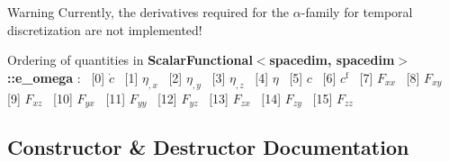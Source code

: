 \begin{DoxyWarning}{Warning}
Currently, the derivatives required for the $\alpha$-\/family for temporal discretization are not implemented!
\end{DoxyWarning}
Ordering of quantities in {\bf Scalar\+Functional$<$spacedim, spacedim$>$\+::e\+\_\+omega} \+:~\newline
\mbox{[}0\mbox{]} $\dot{c}$~\newline
 \mbox{[}1\mbox{]} $\eta_{,x}$~\newline
 \mbox{[}2\mbox{]} $\eta_{,y}$~\newline
 \mbox{[}3\mbox{]} $\eta_{,z}$~\newline
 \mbox{[}4\mbox{]} $\eta$~\newline
 \mbox{[}5\mbox{]} $c$~\newline
 \mbox{[}6\mbox{]} $c^\mathrm{f}$~\newline
 \mbox{[}7\mbox{]} $F_{xx}$~\newline
 \mbox{[}8\mbox{]} $F_{xy}$~\newline
 \mbox{[}9\mbox{]} $F_{xz}$~\newline
 \mbox{[}10\mbox{]} $F_{yx}$~\newline
 \mbox{[}11\mbox{]} $F_{yy}$~\newline
 \mbox{[}12\mbox{]} $F_{yz}$~\newline
 \mbox{[}13\mbox{]} $F_{zx}$~\newline
 \mbox{[}14\mbox{]} $F_{zy}$~\newline
 \mbox{[}15\mbox{]} $F_{zz}$~\newline
 

\subsection{Constructor \& Destructor Documentation}
